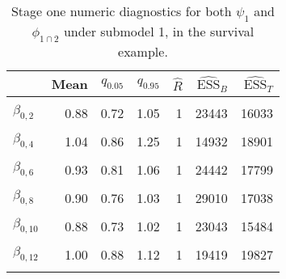 \begin{table}

\caption{\label{tab:surv-stage-one-submodel-one}Stage one numeric diagnostics for both $\psi_{1}$ and $\phi_{1 \cap 2}$ under submodel 1, in the survival example.}
\centering
\begin{tabular}[t]{lrrrrrr}
\toprule
  & Mean & $q_{0.05}$ & $q_{0.95}$ & $\widehat{R}$ & $\widehat{\text{ESS}}_{B}$ & $\widehat{\text{ESS}}_{T}$\\
\midrule
\cellcolor{gray!6}{$\beta_{0, 1}$} & \cellcolor{gray!6}{0.96} & \cellcolor{gray!6}{0.83} & \cellcolor{gray!6}{1.09} & \cellcolor{gray!6}{1} & \cellcolor{gray!6}{23024} & \cellcolor{gray!6}{17665}\\
$\beta_{0, 2}$ & 0.88 & 0.72 & 1.05 & 1 & 23443 & 16033\\
\cellcolor{gray!6}{$\beta_{0, 3}$} & \cellcolor{gray!6}{0.79} & \cellcolor{gray!6}{0.63} & \cellcolor{gray!6}{0.93} & \cellcolor{gray!6}{1} & \cellcolor{gray!6}{14511} & \cellcolor{gray!6}{15038}\\
$\beta_{0, 4}$ & 1.04 & 0.86 & 1.25 & 1 & 14932 & 18901\\
\cellcolor{gray!6}{$\beta_{0, 5}$} & \cellcolor{gray!6}{0.99} & \cellcolor{gray!6}{0.85} & \cellcolor{gray!6}{1.13} & \cellcolor{gray!6}{1} & \cellcolor{gray!6}{19389} & \cellcolor{gray!6}{18920}\\
$\beta_{0, 6}$ & 0.93 & 0.81 & 1.06 & 1 & 24442 & 17799\\
\cellcolor{gray!6}{$\beta_{0, 7}$} & \cellcolor{gray!6}{0.77} & \cellcolor{gray!6}{0.55} & \cellcolor{gray!6}{0.96} & \cellcolor{gray!6}{1} & \cellcolor{gray!6}{12668} & \cellcolor{gray!6}{11859}\\
$\beta_{0, 8}$ & 0.90 & 0.76 & 1.03 & 1 & 29010 & 17038\\
\cellcolor{gray!6}{$\beta_{0, 9}$} & \cellcolor{gray!6}{0.77} & \cellcolor{gray!6}{0.57} & \cellcolor{gray!6}{0.94} & \cellcolor{gray!6}{1} & \cellcolor{gray!6}{12015} & \cellcolor{gray!6}{13107}\\
$\beta_{0, 10}$ & 0.88 & 0.73 & 1.02 & 1 & 23043 & 15484\\
\cellcolor{gray!6}{$\beta_{0, 11}$} & \cellcolor{gray!6}{0.91} & \cellcolor{gray!6}{0.76} & \cellcolor{gray!6}{1.06} & \cellcolor{gray!6}{1} & \cellcolor{gray!6}{24185} & \cellcolor{gray!6}{17149}\\
$\beta_{0, 12}$ & 1.00 & 0.88 & 1.12 & 1 & 19419 & 19827\\
\cellcolor{gray!6}{$\beta_{0, 13}$} & \cellcolor{gray!6}{0.96} & \cellcolor{gray!6}{0.83} & \cellcolor{gray!6}{1.10} & \cellcolor{gray!6}{1} & \cellcolor{gray!6}{21742} & \cellcolor{gray!6}{17949}\\

\end{tabular}
\end{table}
